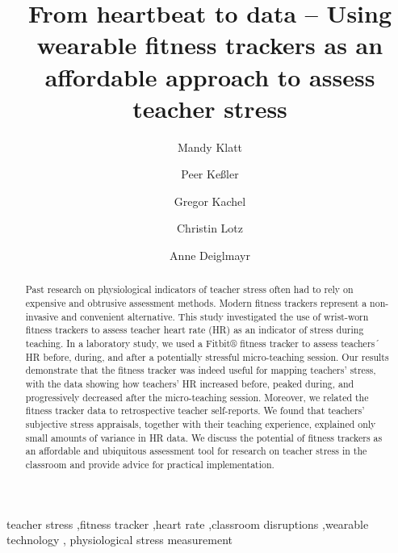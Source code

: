 \documentclass[preprint, 3p,
sort,]{elsarticle} %
\begin{document}
\begin{frontmatter}

  \title{From heartbeat to data -- Using wearable fitness trackers as an
affordable approach to assess teacher stress}
    \author[Leipzig University]{Mandy Klatt%
  }
    \author[Leipzig University]{Peer Keßler%
  }
    \author[Leipzig University, Max Planck Institute for Evolutionary
Anthropology]{Gregor Kachel%
  }
    \author[Leipzig University]{Christin Lotz%
  }
    \author[Leipzig University]{Anne Deiglmayr%
  }
  
  \begin{abstract}
  Past research on physiological indicators of teacher stress often had
  to rely on expensive and obtrusive assessment methods. Modern fitness
  trackers represent a non-invasive and convenient alternative. This
  study investigated the use of wrist-worn fitness trackers to assess
  teacher heart rate (HR) as an indicator of stress during teaching. In
  a laboratory study, we used a Fitbit® fitness tracker to assess
  teachers´ HR before, during, and after a potentially stressful
  micro-teaching session. Our results demonstrate that the fitness
  tracker was indeed useful for mapping teachers' stress, with the data
  showing how teachers' HR increased before, peaked during, and
  progressively decreased after the micro-teaching session. Moreover, we
  related the fitness tracker data to retrospective teacher
  self-reports. We found that teachers' subjective stress appraisals,
  together with their teaching experience, explained only small amounts
  of variance in HR data. We discuss the potential of fitness trackers
  as an affordable and ubiquitous assessment tool for research on
  teacher stress in the classroom and provide advice for practical
  implementation.
  \end{abstract}
    \begin{keyword}
    teacher stress \sep fitness tracker \sep heart rate \sep classroom
disruptions \sep wearable technology \sep 
    physiological stress measurement
  \end{keyword}
  
 \end{frontmatter}
\end{document}
